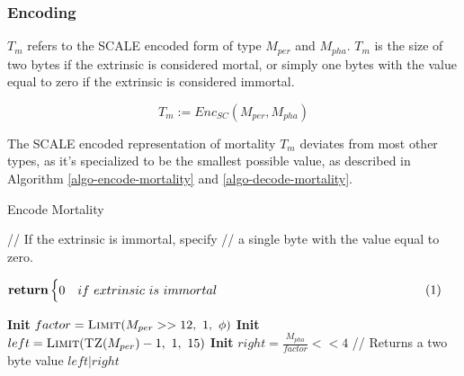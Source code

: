 \begin{definition}
    \subsubsection*{Encoding}\label{sect-mortality-encoding}

    $T_m$ refers to the SCALE encoded form of type $M_{per}$ and $M_{pha}$.
    $T_m$ is the size of two bytes if the extrinsic is considered mortal,
    or simply one bytes with the value equal to zero if the extrinsic is
    considered immortal.

    \[
        T_m := Enc_{SC}(M_{per}, M_{pha})
    \]

    The SCALE encoded representation of mortality $T_m$ deviates from most
    other types, as it's specialized to be the smallest possible value, as
    described in Algorithm \ref{algo-encode-mortality} and
    \ref{algo-decode-mortality}.

    \begin{algorithm}[H]
        \caption[]{\sc Encode Mortality}
        \label{algo-encode-mortality}
        \begin{algorithmic}[1]
            \Statex // If the extrinsic is immortal, specify
            \Statex // a single byte with the value equal to zero.
            \State $\vcenter{
                \begin{flalign*}
                    \Return & 
                    \begin{cases}
                    0 & if\ extrinsic\ is\ immortal 
                    \end{cases}&
                \end{flalign*}
            }$
            \State \textbf{Init} $factor = \textsc{Limit}(M_{per} >> 12,\ 1,\ \phi)$
            \State \textbf{Init} $left = \textsc{Limit}(\textsc{TZ}(M_{per})-1,\ 1,\ 15)$
            \State \textbf{Init} $right = \frac{M_{pha}}{factor} << 4$
            \Statex
            \Statex // Returns a two byte value
            \State \Return $left|right$
        \end{algorithmic}
    \end{algorithm}


\end{definition}
